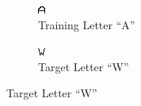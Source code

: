 \documentclass[a4paper,12pt]{report}
\begin{document}
\begin{figure}
\begin{subfigure}[h!]{0.3\textwidth}
        \end{subfigure}
        \quad \quad \quad \quad \quad \quad
        \begin{subfigure}[h!]{0.3\textwidth}
                \includegraphics[width=\textwidth]{A1.png}
                \caption{Training Letter ``A''}
                
        \end{subfigure}
        
        \vskip 6cm
        \begin{subfigure}[h!]{0.3\textwidth}
                \includegraphics[width=\textwidth]{W.png}
                \caption{Target Letter ``W''}
                

\end{subfigure}
\end{figure}
\end{document}
